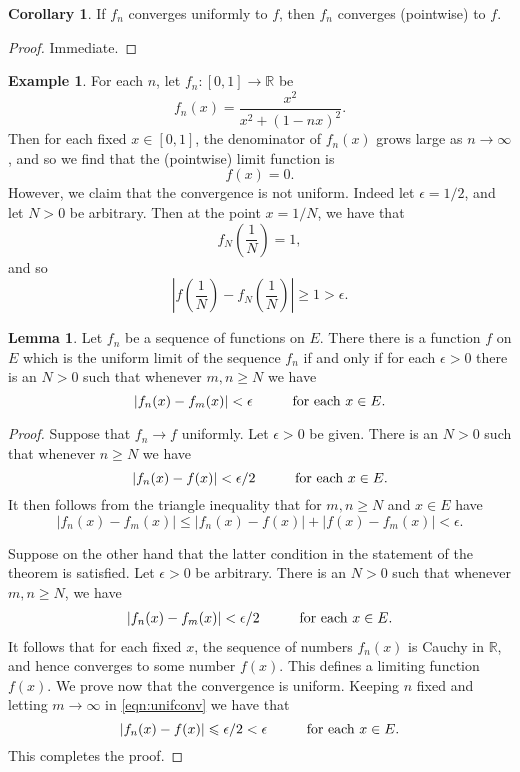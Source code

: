 \documentclass[12pt]{article}
\theoremstyle{definition}
\newtheorem{example}[definition]{Example}
\theoremstyle{theorem}
\newtheorem{corollary}[definition]{Corollary}
\newtheorem{lemma}[definition]{Lemma}
\begin{document}
\begin{corollary}
If $f_n$ converges uniformly to $f$, then $f_n$ converges (pointwise) to $f$. 
\end{corollary}

\begin{proof}
Immediate.
\end{proof}

\begin{example}
For each $n$, let $f_n : [0,1] \to \mathbb{R}$ be 
\[
f_n(x) = \frac{x^2}{x^2 + (1-nx)^2}.
\]
Then for each fixed $x \in [0,1]$, the denominator of $f_n(x)$ grows large as $n \to \infty$, and so we find that the (pointwise) limit function is 
\[
f(x) = 0.
\]
However, we claim that the convergence is not uniform. Indeed let $\epsilon = 1/2$, and let $N > 0$ be arbitrary. Then at the point $x = 1/N$, we have that  
\[
f_{N}\left(\frac{1}{N}\right) = 1,
\]
and so 
\[
\left|f\left(\frac{1}{N}\right) - f_N\left(\frac{1}{N}\right)\right| \geqslant 1 > \epsilon.
\]
\end{example}

\begin{lemma}\label{lem:uniformconv}
Let $f_n$ be a sequence of functions on $E$. There there is a function $f$ on $E$ which is the uniform limit of the sequence $f_n$ if and only if for each $\epsilon > 0$ there is an $N > 0$ such that whenever $m,n \geqslant N$ we have 
\[
|f_n(x) - f_m(x)| < \epsilon \hspace{10mm} \text{for each $x \in E$.}
\]
\end{lemma}

\begin{proof}
Suppose that $f_n \to f$ uniformly. Let $\epsilon > 0$ be given. There is an $N > 0$ such that whenever $n \geqslant N$ we have 
\[
|f_n(x) - f(x)| < \epsilon/2 \hspace{10mm} \text{for each $x \in E$}.
\]
It then follows from the triangle inequality that for $m,n \geqslant N$ and $x \in E$ have 
\[
|f_n(x) - f_m(x)| \leqslant |f_n(x) - f(x)| + |f(x) - f_m(x)| < \epsilon.
\]

Suppose on the other hand that the latter condition in the statement of the theorem is satisfied. Let $\epsilon > 0$ be arbitrary. There is an $N > 0$ such that whenever $m,n \geqslant N$, we have 
\begin{align}\label{eqn:unifconv}
|f_n(x) - f_m(x)| < \epsilon/2 \hspace{10mm} \text{for each $x \in E$}.
\end{align}
It follows that for each fixed $x$, the sequence of numbers $f_n(x)$ is Cauchy in $\mathbb{R}$, and hence converges to some number $f(x)$. This defines a limiting function $f(x)$. We prove now that the convergence is uniform. Keeping $n$ fixed and letting $m \to \infty$ in \eqref{eqn:unifconv} we have that 
\[
|f_n(x) - f(x)| \leqslant \epsilon/2 < \epsilon \hspace{10mm} \text{for each $x \in E$.}
\]
This completes the proof. 
\end{proof}
\end{document}
